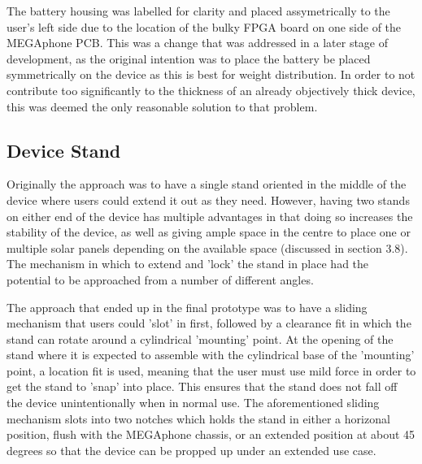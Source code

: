 The battery housing was labelled for clarity and placed assymetrically to the user's left side due to the location of the bulky FPGA board on one side of the MEGAphone PCB.
This was a change that was addressed in a later stage of development, as the original intention was to place the battery be placed symmetrically on the device as this is best for weight distribution.
In order to not contribute too significantly to the thickness of an already objectively thick device, this was deemed the only reasonable solution to that problem.

\subsection{Device Stand}

Originally the approach was to have a single stand oriented in the middle of the device where users could extend it out as they need.
However, having two stands on either end of the device has multiple advantages in that doing so increases the stability of the device, as well as giving ample space in the centre to place one or multiple solar panels depending on the available space (discussed in section 3.8).
The mechanism in which to extend and 'lock' the stand in place had the potential to be approached from a number of different angles.

The approach that ended up in the final prototype was to have a sliding mechanism that users could 'slot' in first, followed by a clearance fit in which the stand can rotate around a cylindrical 'mounting' point.  %
At the opening of the stand where it is expected to assemble with the cylindrical base of the 'mounting' point, a location fit is used, meaning that the user must use mild force in order to get the stand to 'snap' into place.
This ensures that the stand does not fall off the device unintentionally when in normal use.
The aforementioned sliding mechanism slots into two notches which holds the stand in either a horizonal position, flush with the MEGAphone chassis, or an extended position at about 45 degrees so that the device can be propped up under an extended use case.

